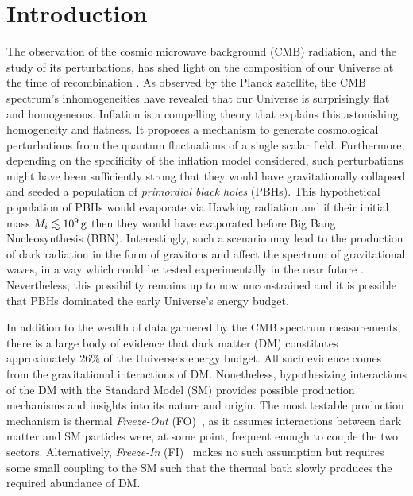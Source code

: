 \documentclass[aps,prd,reprint,twocolumn,preprintnumbers,floatfix,nofootinbib]{revtex4-1}
\begin{document}
\section{Introduction}
The observation of the cosmic microwave background (CMB) radiation, and the study of its perturbations, has shed light on the composition of our Universe at the time of recombination \cite{Ade:2015lrj,Ade:2015xua}. As observed by the Planck satellite, the CMB spectrum's inhomogeneities have revealed that our Universe is surprisingly flat and homogeneous. Inflation is a compelling theory that explains this astonishing homogeneity and flatness. It proposes a mechanism to generate cosmological perturbations from the quantum fluctuations of a single scalar field. Furthermore, depending on the specificity of the inflation model considered, such perturbations might have been sufficiently strong that they would have gravitationally collapsed and seeded a population of {\em primordial black holes} (PBHs). This hypothetical population of PBHs would evaporate via Hawking radiation \cite{Hawking:1974rv,Hawking:1974sw} and if their initial mass $M_{i}\lesssim 10^{9}\,\rm{g}$ then they would have evaporated before Big Bang Nucleosynthesis (BBN). 
{Interestingly, such a scenario may lead to the production of dark radiation in the form of gravitons and affect the spectrum of gravitational waves, in a way which could be tested experimentally in the near future \cite{Masina:2020xhk, Arbey:2021ysg, Domenech:2021wkk}. Nevertheless, this possibility remains up to now unconstrained and it is possible that PBHs dominated the early Universe's energy budget.}

In addition to the wealth of data garnered by the CMB spectrum measurements, there is a large body of evidence that dark matter (DM) constitutes approximately 26$\%$ of the Universe's energy budget. All such evidence comes from the gravitational interactions of DM. Nonetheless, hypothesizing interactions of the DM with the Standard Model (SM) provides possible production mechanisms and insights into its nature and origin. The most testable production mechanism is thermal {\em Freeze-Out} (FO)~\cite{STEIGMAN1985375}, as it assumes interactions between dark matter and SM particles were, at some point, frequent enough to couple the two sectors. Alternatively, {\em Freeze-In} (FI)~\cite{McDonald:2001vt,Hall:2009bx} makes no such assumption but requires some small coupling to the SM such that the thermal bath slowly produces the required abundance of DM.
\end{document}
